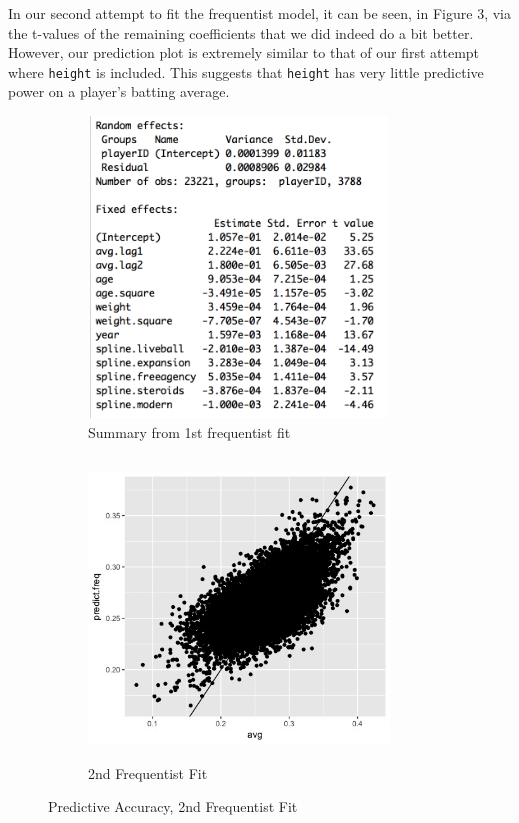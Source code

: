 \documentclass[10pt,a4paper]{article}
\begin{document}
In our second attempt to fit the frequentist model, it can be seen, in Figure 3, via the t-values of the remaining coefficients that we did indeed do a bit better. However, our prediction plot is extremely similar to that of our first attempt where \texttt{height} is included. This suggests that \texttt{height} has very little predictive power on a player's batting average.
\begin{figure}[H]
\begin{subfigure}{0.5\textwidth}
\includegraphics[width=8cm,height=8cm]{../freqsummary2}
\caption{Summary from 1st frequentist fit}
\label{fig:subim2}
\end{subfigure}
\begin{subfigure}{0.5\textwidth}
\includegraphics[width=8cm,height=8cm]{../Freqfit2.jpeg}
\caption{2nd Frequentist Fit}
\label{fig:subim1}
\end{subfigure}

\caption{Predictive Accuracy, 2nd Frequentist Fit}
\end{figure}
\end{document}
